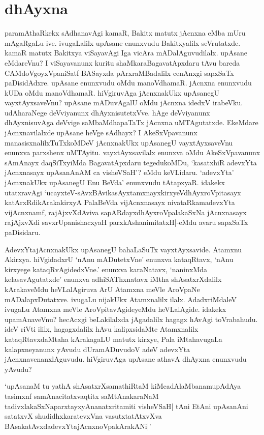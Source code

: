 \chapter{dhAyxna}\label{chap4}

paramAthaRkekx sAdhanavAgi kamaR, Bakitx matutx jAcnxna eMba mUru mAgaRgaLu ive. ivugaLalilx upAsane enunxvudu Bakitxyalilx seVrutatxde. kamaR matutx Bakitxya viSayavAgi Iga vicAra mADalAguvudilalx. upAsane eMdareVnu? I viSayavanunx kuritu shaMkaraBagavatApxdaru tAvu bareda CAMdoVgoyxVpaniSatf BASayxda pArxraMBadalilx cenAnxgi sapxSaTx paDisidAdxre. upAsane enunxvudu oMdu manoVdhamaR. jAcnxna enunxvudu kUDa oMdu manoVdhamaR. hiVgiruvAga jAcnxnakUkx upAsanegU vayxtAyxsaveVnu? upAsane mADuvAgalU oMdu jAcnxna idedxV irabeVku. udAharaNege deVviyanunx dhAyxnisutetxVve. hAge deVviyanunx dhAyxnisuvAga deVvige saMbaMdhapaTaTx jAcnxna uMTAgutatxde. EkeMdare jAcnxnavilalxde upAsane heVge sAdhayx? I AkeSxVpavanunx manasisxnalilxTuTxkoMDeV jAcnxnakUkx upAsanegU vayxtAyxsaveVnu enunxva parxshenx uMTAyitu. vayxtAyxsavilalx enunxva oMdu AkeSxVpavanunx sAmAnayx daqSiTxyiMda BagavatApxdaru tegedukoMDu, `kasatxhiR adevxYta jAcnxnasayx upAsanAnAM ca visheVSaH'? eMdu keVLidaru. `adevxYta' jAcnxnakUkx upAsanegU Enu BeVda' enunxvudu tAtapxyaR. idakekx utatxravAgi `ucayxteV-sAvxBAvikasAyxtamxnayxkirxyeV\s dhAyxroVpitasayx katArxRdikArakakirxyA PalaBeVda vijAcnxnasayx nivataRkamadevxYta vijAcnxnamf, rajAjxvXdAviva sapARdayxdhAyxroVpalakaSxNa jAcnxnasayx rajAjxvXdi savxrUpanishacxyaH parxkAshanimitatxH|-eMdu avaru sapxSaTx paDisidaru.

AdevxYtajAcnxnakUkx upAsanegU bahaLaSuTx vayxtAyxsavide. Atamxnu Akirxya. hiVgidadxrU `nAnu mADutetxVne' enunxva kataqRtavx, `nAnu kirxyege kataqRvAgidedxVne.' enunxva karaNatavx, `naninxMda kelasavAgutatxde' enunxva adhiSAThxnatavx iMtha shAsatxrXdalilx kArakaveMdu heVLalAgiruva ArU Atamxna meVle AroVpaNe mADalapxDutatxve. ivugaLu nijakUkx Atamxnalilx ilalx. AdadxriMdaleV ivugaLu Atamxna meVle AroVpitavAgideyeMdu heVLalAgide. idakekx upamAnaveVnu? hecAcxgi beLakilalxda jAgadalilx hagagx hAvAgi toVrabahudu. ideV riVti ililx, hagagxdalilx hAvu kalipxsidaMte Atamxnalilx kataqRtavxdaMtaha kArakagaLU matutx kirxye, Pala iMtahavugaLa kalapxneyanunx yAvudu dUramADuvudoV adeV adevxYta jAcnxnavenanxlAguvudu. hiVgiruvAga upAsane athavA dhAyxna enunxvudu yAvudu?

`upAsanaM tu yathA shAsatxrXsamathiRtaM kiMcadAlaMbanamupAdAya tasimxnf samAnacitatxvaqtitx saMtAnakaraNaM tadivxlakaSxNaparxtayxyAnanatxritamiti visheVSaH| tAni EtAni upAsanAni satatxvX shudidhxkaratevxVna vasutxtatAtxvXva BAsakatAvxdadevxYtajAcnxnoVpakArakANi|'

